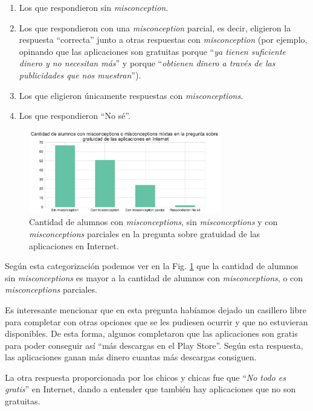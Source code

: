 \begin{enumerate}
\item Los que respondieron sin \textit{misconception}.
\item Los que respondieron con una \textit{misconception} parcial, es decir, eligieron la respuesta “correcta” junto a otras respuestas con \textit{misconception} (por ejemplo, opinando que las aplicaciones son gratuitas porque ``\textit{ya tienen suficiente dinero y no necesitan más}'' y porque ``\textit{obtienen dinero a través de las publicidades que nos muestran}'').
\item Los que eligieron únicamente respuestas con \textit{misconceptions}.
\item Los que respondieron “No sé”.
\end{enumerate}

\begin{figure}[h]
    \centering
    \includegraphics[width=0.75\textwidth]{images_analisis/24.pdf}
    \caption{Cantidad de alumnos con \textit{misconceptions}, sin \textit{misconceptions} y con \textit{misconceptions} parciales en la pregunta sobre gratuidad de las aplicaciones en Internet.}
    \label{fig:analisis24}
\end{figure}


Según esta categorización podemos ver en la Fig. \ref{fig:analisis24} que la cantidad de alumnos sin \textit{misconceptions} es mayor a la cantidad de alumnos con \textit{misconceptions}, o con \textit{misconceptions} parciales.

Es interesante mencionar que en esta pregunta habíamos dejado un casillero libre para completar con otras opciones que se les pudiesen ocurrir y que no estuvieran disponibles. De esta forma, algunos completaron que las aplicaciones son gratis para poder conseguir así ``más descargas en el Play Store''. Según esta respuesta, las aplicaciones ganan más dinero cuantas más descargas consiguen.

La otra respuesta proporcionada por los chicos y chicas fue que ``\textit{No todo es gratis}'' en Internet, dando a entender que también hay aplicaciones que no son gratuitas.

